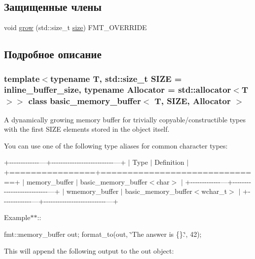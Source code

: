 \subsection*{Защищенные члены}
\begin{DoxyCompactItemize}
\item 
void \hyperlink{classbasic__memory__buffer_a2f01489b9805a99cdc93ab0aee6730eb}{grow} (std\+::size\+\_\+t \hyperlink{classinternal_1_1buffer_abac844b364cd93450a9c311807d15f80}{size}) F\+M\+T\+\_\+\+O\+V\+E\+R\+R\+I\+DE
\end{DoxyCompactItemize}


\subsection{Подробное описание}
\subsubsection*{template$<$typename T, std\+::size\+\_\+t S\+I\+ZE = inline\+\_\+buffer\+\_\+size, typename Allocator = std\+::allocator$<$\+T$>$$>$\newline
class basic\+\_\+memory\+\_\+buffer$<$ T, S\+I\+Z\+E, Allocator $>$}

A dynamically growing memory buffer for trivially copyable/constructible types with the first {\ttfamily S\+I\+ZE} elements stored in the object itself.

You can use one of the following type aliases for common character types\+:

+-\/-\/-\/-\/-\/-\/-\/-\/-\/-\/-\/-\/-\/---+-\/-\/-\/-\/-\/-\/-\/-\/-\/-\/-\/-\/-\/-\/-\/-\/-\/-\/-\/-\/-\/-\/-\/-\/-\/-\/-\/---+ $\vert$ Type $\vert$ Definition $\vert$ +================+==============================+ $\vert$ memory\+\_\+buffer $\vert$ basic\+\_\+memory\+\_\+buffer$<$char$>$ $\vert$ +-\/-\/-\/-\/-\/-\/-\/-\/-\/-\/-\/-\/-\/---+-\/-\/-\/-\/-\/-\/-\/-\/-\/-\/-\/-\/-\/-\/-\/-\/-\/-\/-\/-\/-\/-\/-\/-\/-\/-\/-\/---+ $\vert$ wmemory\+\_\+buffer $\vert$ basic\+\_\+memory\+\_\+buffer$<$wchar\+\_\+t$>$ $\vert$ +-\/-\/-\/-\/-\/-\/-\/-\/-\/-\/-\/-\/-\/---+-\/-\/-\/-\/-\/-\/-\/-\/-\/-\/-\/-\/-\/-\/-\/-\/-\/-\/-\/-\/-\/-\/-\/-\/-\/-\/-\/---+

Example$\ast$$\ast$\+:\+:

fmt\+::memory\+\_\+buffer out; format\+\_\+to(out, \char`\"{}\+The answer is \{\}.\char`\"{}, 42);

This will append the following output to the {\ttfamily out} object\+:

